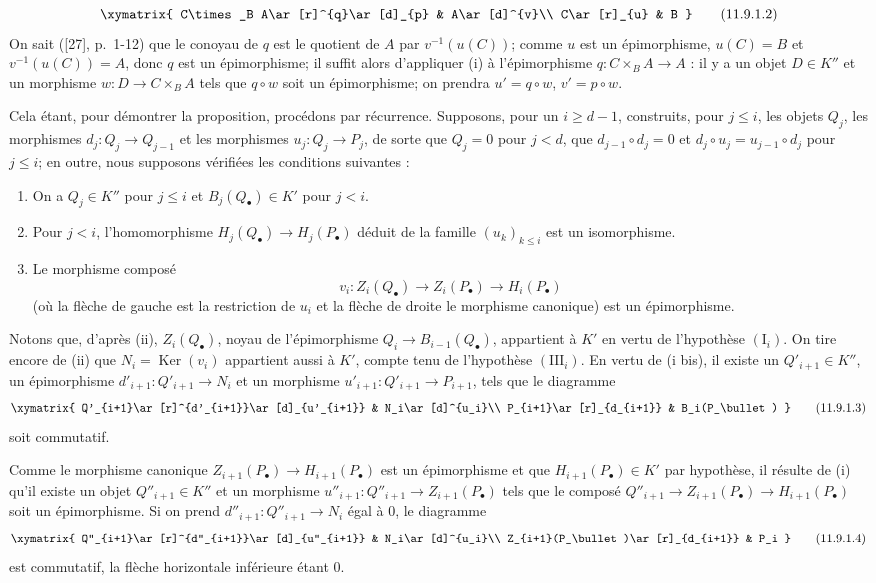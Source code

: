 \[
\xymatrix{
C\times_B A\ar[r]^{q}\ar[d]_{p} & A\ar[d]^{v}\\
C\ar[r]_{u} & B
}
\tag{11.9.1.2}\label{0.11.9.1.2-fr}
\]
On sait ([27], p.~1-12) que le conoyau de $q$ est le quotient de $A$ par
$v^{-1}(u(C))$; comme $u$ est un épimorphisme, $u(C)=B$ et
$v^{-1}(u(C))=A$, donc $q$ est un épimorphisme; il suffit alors d'appliquer
(i) à l'épimorphisme $q:C\times_B A\to A$ : il y a un objet $D\in K''$ et un
morphisme $w:D\to C\times_B A$ tels que $q\circ w$ soit un épimorphisme; on
prendra $u'=q\circ w$, $v'=p\circ w$.

Cela étant, pour démontrer la proposition, procédons par récurrence.
Supposons, pour un $i\geq d-1$, construits, pour $j\leq i$, les objets $Q_j$,
les morphismes $d_j:Q_j\to Q_{j-1}$ et les morphismes $u_j:Q_j\to P_j$, de
sorte que $Q_j=0$ pour $j<d$, que $d_{j-1}\circ d_j=0$ et
$d_j\circ u_j=u_{j-1}\circ d_j$ pour $j\leq i$; en outre, nous supposons
vérifiées les conditions suivantes :
\begin{enumerate}
\item[$(\mathrm I_i)$] On a $Q_j\in K''$ pour $j\leq i$ et
$B_j(Q_\bullet)\in K'$ pour $j<i$.
\item[$(\mathrm{II}_i)$] Pour $j<i$, l'homomorphisme
$H_j(Q_\bullet)\to H_j(P_\bullet)$ déduit de la famille $(u_k)_{k\leq i}$
est un isomorphisme.
\item[$(\mathrm{III}_i)$] Le morphisme composé
\[
v_i:Z_i(Q_\bullet)\longrightarrow Z_i(P_\bullet)
\longrightarrow H_i(P_\bullet)
\]
(où la flèche de gauche est la restriction de $u_i$ et la flèche de droite
le morphisme canonique) est un épimorphisme.
\end{enumerate}
Notons que, d'après (ii), $Z_i(Q_\bullet)$, noyau de l'épimorphisme
$Q_i\to B_{i-1}(Q_\bullet)$, appartient à $K'$ en vertu de l'hypothèse
$(\mathrm I_i)$. On tire encore de (ii) que
$N_i=\operatorname{Ker}(v_i)$ appartient aussi à $K'$, compte tenu de
l'hypothèse $(\mathrm{III}_i)$. En vertu de (i bis), il existe un
$Q'_{i+1}\in K''$, un épimorphisme $d'_{i+1}:Q'_{i+1}\to N_i$ et un
morphisme $u'_{i+1}:Q'_{i+1}\to P_{i+1}$, tels que le diagramme
\[
\xymatrix{
Q'_{i+1}\ar[r]^{d'_{i+1}}\ar[d]_{u'_{i+1}} &
N_i\ar[d]^{u_i}\\
P_{i+1}\ar[r]_{d_{i+1}} & B_i(P_\bullet)
}
\tag{11.9.1.3}\label{0.11.9.1.3-fr}
\]
soit commutatif.

Comme le morphisme canonique $Z_{i+1}(P_\bullet)\to H_{i+1}(P_\bullet)$ est
un épimorphisme et que $H_{i+1}(P_\bullet)\in K'$ par hypothèse, il résulte
de (i) qu'il existe un objet $Q''_{i+1}\in K''$ et un morphisme
$u''_{i+1}:Q''_{i+1}\to Z_{i+1}(P_\bullet)$ tels que le composé
$Q''_{i+1}\to Z_{i+1}(P_\bullet)\to H_{i+1}(P_\bullet)$ soit un
épimorphisme. Si on prend $d''_{i+1}:Q''_{i+1}\to N_i$ égal à $0$, le
diagramme
\[
\xymatrix{
Q''_{i+1}\ar[r]^{d''_{i+1}}\ar[d]_{u''_{i+1}} &
N_i\ar[d]^{u_i}\\
Z_{i+1}(P_\bullet)\ar[r]_{d_{i+1}} & P_i
}
\tag{11.9.1.4}\label{0.11.9.1.4-fr}
\]
est commutatif, la flèche horizontale inférieure étant $0$.
